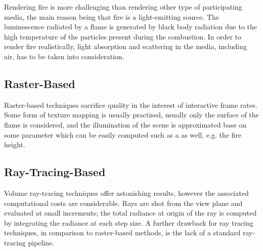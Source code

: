 Rendering fire is more challenging than rendering other type of participating media, the main reason being that fire is a light-emitting source.
The luminescence radiated by a flame is generated by black body radiation due to the high temperature of the particles present during the combustion.
In order to render fire realistically, light absorption and scattering in the media, including air, has to be taken into consideration.

\subsection{Raster-Based}
\label{sec:raster_based}

Raster-based techniques sacrifice quality in the interest of interactive frame rates.
Some form of texture mapping is usually practised, usually only the surface of the flame is considered, and the illumination of the scene is approximated base on some parameter which can be easily computed such as a as well, e.g. the fire height.


\cite{Lamorlette:2002}


\subsection{Ray-Tracing-Based}
\label{sec:ray_tracing_based}

Volume ray-tracing techniques offer astonishing results, however the associated computational costs are considerable.
Rays are shot from the view plane and evaluated at small increments; the total radiance at origin of the ray is computed by integrating the radiance at each step size.
A further drawback for ray tracing techniques, in comparison to raster-based methods, is the lack of a standard ray-tracing pipeline.

